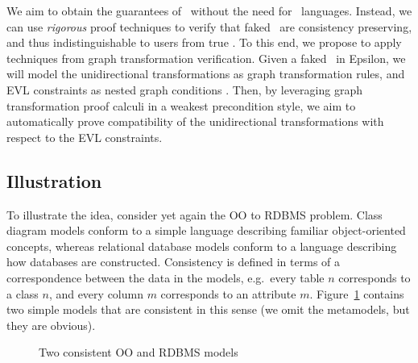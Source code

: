 We aim to obtain the guarantees of \BX\ without
the need for \BX\ languages. Instead, we can use \emph{rigorous} proof
techniques to verify that faked \BX\ are consistency preserving, and thus
indistinguishable to users from true \BX. To this end, we propose to apply
techniques from graph transformation verification. Given a faked \BX\ in
Epsilon, we will model the unidirectional transformations as graph
transformation rules, and EVL constraints as nested graph conditions
\cite{Habel-Pennemann09a}. Then, by leveraging graph transformation proof
calculi \cite{Habel-Pennemann-Rensink06a,Poskitt13a,Poskitt-Plump12a} in a
weakest precondition style, we aim to automatically prove compatibility of the
unidirectional transformations with respect to the EVL
constraints. 

\subsection{Illustration}
To illustrate the idea, consider yet again the OO to RDBMS problem. Class diagram models conform to a simple language describing familiar object-oriented concepts, whereas relational database models conform to a language describing how databases are constructed. Consistency is defined in terms of a correspondence between the data in the models, e.g.\ every table $n$ corresponds to a class $n$, and every column $m$ corresponds to an attribute $m$. Figure~\ref{fig:cd2rdbm_example} contains two simple models that are consistent in this sense (we omit the metamodels, but they are obvious).	

\begin{figure}[htbp]
\caption{Two consistent OO and RDBMS models}
\label{fig:cd2rdbm_example}
\end{figure}

	
